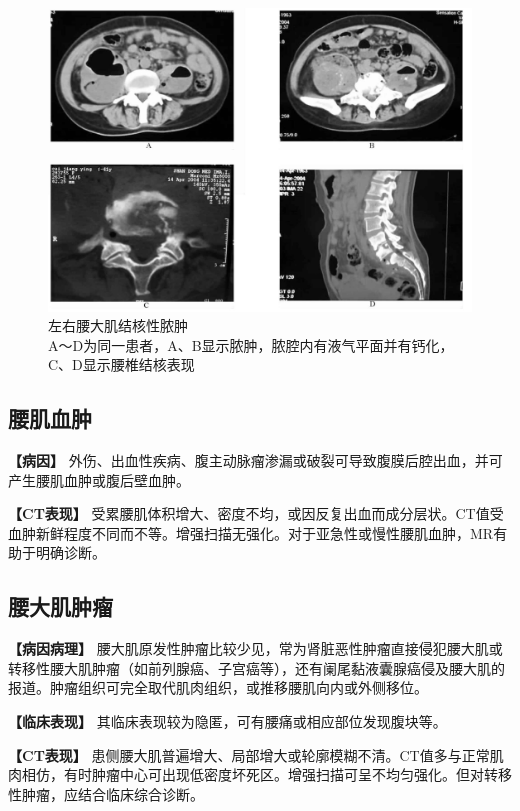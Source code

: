 \begin{figure}[!htbp]
 \centering
 \includegraphics[width=.7\textwidth,height=\textheight,keepaspectratio]{./images/Image00388.jpg}
 \captionsetup{justification=centering}
 \caption{左右腰大肌结核性脓肿\\{\small A～D为同一患者，A、B显示脓肿，脓腔内有液气平面并有钙化，C、D显示腰椎结核表现}}
 \label{fig19-7}
  \end{figure} 

\subsection{腰肌血肿}

\textbf{【病因】}
外伤、出血性疾病、腹主动脉瘤渗漏或破裂可导致腹膜后腔出血，并可产生腰肌血肿或腹后壁血肿。

\textbf{【CT表现】}
受累腰肌体积增大、密度不均，或因反复出血而成分层状。CT值受血肿新鲜程度不同而不等。增强扫描无强化。对于亚急性或慢性腰肌血肿，MR有助于明确诊断。

\subsection{腰大肌肿瘤}

\textbf{【病因病理】}
腰大肌原发性肿瘤比较少见，常为肾脏恶性肿瘤直接侵犯腰大肌或转移性腰大肌肿瘤（如前列腺癌、子宫癌等），还有阑尾黏液囊腺癌侵及腰大肌的报道。肿瘤组织可完全取代肌肉组织，或推移腰肌向内或外侧移位。

\textbf{【临床表现】} 其临床表现较为隐匿，可有腰痛或相应部位发现腹块等。

\textbf{【CT表现】}
患侧腰大肌普遍增大、局部增大或轮廓模糊不清。CT值多与正常肌肉相仿，有时肿瘤中心可出现低密度坏死区。增强扫描可呈不均匀强化。但对转移性肿瘤，应结合临床综合诊断。

\protect\hypertarget{text00027.html}{}{}

